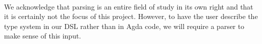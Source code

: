 {\begin{code}
\AgdaSymbol{(}\AgdaSymbol{;}\AgdaSpace{}%
\AgdaSymbol{;}\AgdaSpace{}%
\AgdaInductiveConstructor{[]}\AgdaSymbol{)}\<%
\\
\>[0]\AgdaSpace{}%
\AgdaSpace{}%
\AgdaSpace{}%
\AgdaSpace{}%
\AgdaSymbol{(}\AgdaSymbol{)}\<%
\\
\>[0]\AgdaSpace{}%
\AgdaSpace{}%
\<%
\\
\>[0]\AgdaSpace{}%
\AgdaSpace{}%
\AgdaSpace{}%
\AgdaSpace{}%
\AgdaSymbol{(}\AgdaSpace{}%
\AgdaSpace{}%
\AgdaSymbol{)}\<%
\\
\>[0]\AgdaSpace{}%
\AgdaSpace{}%
\AgdaSpace{}%
\AgdaSpace{}%
\AgdaSymbol{(}\AgdaSymbol{)}\<%
\\
\>[0]\AgdaSpace{}%
\AgdaSpace{}%
\<%
\\
\>[0]\AgdaSpace{}%
\AgdaSpace{}%
\AgdaSymbol{=}\AgdaSpace{}%
\AgdaSpace{}%
\AgdaSymbol{\{}\AgdaSpace{}%
\AgdaSymbol{=}\AgdaSpace{}%
\AgdaSymbol{\}}\AgdaSpace{}%
\<%
\end{code}
}
We acknowledge that parsing is an entire field of study in its own right
and that it is certainly not the focus of this project. However,
to have the user describe the type system in our DSL rather than in Agda
code, we will require a parser to make sense of this input.

